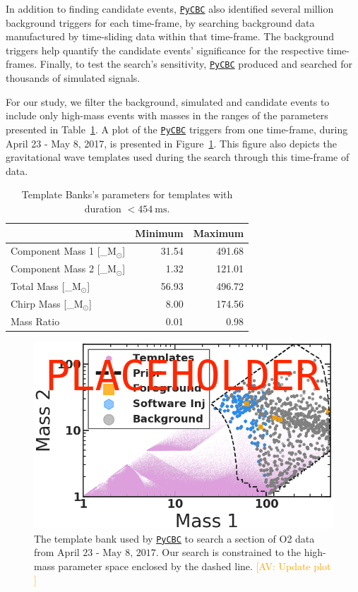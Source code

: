 \documentclass[%
 nofootinbib,
 amsmath,amssymb,
 aps,
 twocolumn
]{revtex4-2}
\newcommand{\pycbc}{{\sc \href{https://pycbc.org/}{\texttt{PyCBC}}}\xspace}
\newcommand{\mathcmd}[1]{{\sc \relax\ifmmode#1\else $#1$\fi}\xspace}
\newcommand{\msun}{\mathcmd{\text{M}_\odot}}
\newcommand{\av}[1]{\textcolor{orange}{[AV: #1]}}
\begin{document}
In addition to finding candidate events, \pycbc also identified several million background triggers for each time-frame, by searching background data manufactured by time-sliding data within that time-frame. The background triggers help quantify the candidate events' significance for the respective time-frames. Finally, to test the search's sensitivity, \pycbc produced and searched for thousands of simulated signals. 

For our study, we filter the background, simulated and candidate events to  include only high-mass events with masses in the ranges of the parameters presented in Table~\ref{tab:parameters}. A plot of the \pycbc triggers from one time-frame, during April 23 - May 8, 2017, is presented in Figure~\ref{fig:templateBank}. This figure also depicts the gravitational wave templates used during the search through this time-frame of data. 


\begin{table}[t]

\caption[BBH parameters corresponding to duration $<454\ \text{ms}$]{\label{tab:parameters}Template Banks's parameters for templates with duration $<454 \ \text{ms}$.}
\centering
\begin{tabular}{lrr}
\toprule
  & Minimum & Maximum\\
\midrule
Component Mass 1 [\msun] & 31.54 & 491.68\\
Component Mass 2 [\msun] & 1.32 & 121.01\\
Total Mass [\msun] & 56.93 & 496.72\\
Chirp Mass [\msun] & 8.00 & 174.56\\
Mass Ratio & 0.01 & 0.98\\
\end{tabular}
\end{table}





\begin{figure}[!ht]

{\centering \includegraphics[width=0.75\linewidth]{images/template_bank_masses} 

}
\caption[High-mass BCR search space.]{The template bank used by \pycbc to search a section of O2 data from $\text{April 23 - May 8, 2017}$. Our search is constrained to the high-mass parameter space enclosed by the dashed line. \av{Update plot }}\label{fig:templateBank}
\end{figure}
\end{document}
